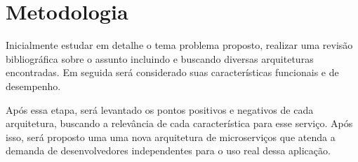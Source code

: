 \section{Metodologia}
\label{met}

Inicialmente estudar em detalhe o tema problema proposto, realizar uma revisão bibliográfica sobre o assunto incluindo e buscando diversas arquiteturas encontradas. Em seguida será considerado suas características funcionais e de desempenho.

Após essa etapa, será levantado os pontos positivos e negativos de cada arquitetura, buscando a relevância de cada característica para esse serviço. Após isso, será proposto uma uma nova arquitetura de microserviços que atenda a demanda de desenvolvedores independentes para o uso real dessa aplicação.
